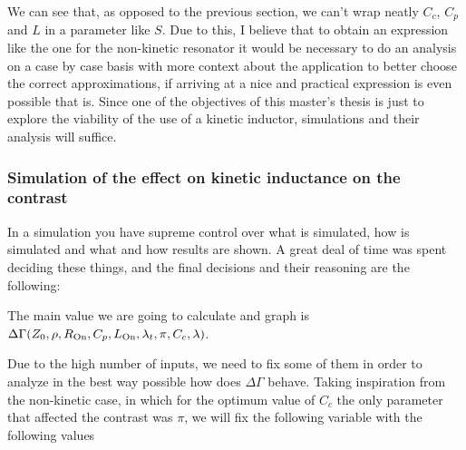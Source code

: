 \documentclass[../main.tex]{subfiles}
\begin{document}
We can see that, as opposed to the previous section,
we can't wrap neatly \(C_{c}\), \(C_{p}\) and \(L\) in a parameter like \(S\).
Due to this, I believe that to obtain an expression like the one for the
non-kinetic resonator it would be necessary to do an analysis on a case by
case basis with more context about the application to better choose the correct
approximations, if arriving at a nice and practical expression is even possible
that is. Since one of the objectives of this master's thesis is just to explore
the viability of the use of a kinetic inductor, simulations
and their analysis will suffice.

\subsubsection{Simulation of the effect on kinetic inductance on the contrast}
In a simulation you have supreme control over what is simulated, how is
simulated and what and how results are shown. A great deal of time was spent
deciding these things, and the final decisions and their reasoning are the following:

The main value we are going to calculate and graph is
\(\Delta\Gamma(Z_{0}, \rho, R_{\text{On}}, C_{p}, L_{\text{On}}, \lambda_{t}, \pi, C_{c}, \lambda)\).

Due to the high number of inputs, we need to fix some of them in order to analyze
in the best way possible how does \(\Delta\Gamma\) behave. Taking inspiration
from the non-kinetic case, in which for the optimum value of \(C_{c}\) the
only parameter that affected the contrast was \(\pi\), we will fix the following
variable with the following values

\end{document}
